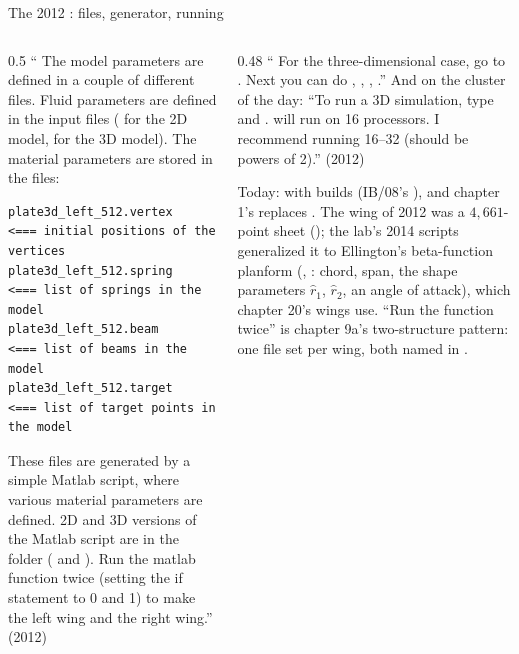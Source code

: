 \documentclass[aspectratio=169,11pt]{beamer}
\begin{document}
\begin{frame}[fragile]{The 2012 : files, generator, running}
\label{fr:plates3d}
\vspace{-2mm}
\begin{columns}[T,onlytextwidth]
\begin{column}{0.5\textwidth}
\footnotesize `` The model parameters are defined in a couple of different files. Fluid parameters are defined in the input files ( for the 2D model,  for the 3D model). The material parameters are stored in the files:
\begin{lstlisting}[style=data]
plate3d_left_512.vertex     <=== initial positions of the vertices
plate3d_left_512.spring     <=== list of springs in the model
plate3d_left_512.beam       <=== list of beams in the model
plate3d_left_512.target     <=== list of target points in the model
\end{lstlisting}
These files are generated by a simple Matlab script, where various material parameters are defined. 2D and 3D versions of the Matlab script are in the  folder ( and ). Run the matlab function twice (setting the if statement to 0 and 1) to make the left wing and the right wing.'' (2012)
\end{column}
\begin{column}{0.48\textwidth}
\footnotesize `` For the three-dimensional case, go to . Next you can do , , , .'' And on the cluster of the day: ``To run a 3D simulation, type  and .  will run on 16 processors. I recommend running 16--32 (should be powers of 2).'' (2012)
\vspace{1mm}

\scriptsize Today:  with  builds  (IB/08's ), and chapter 1's  replaces . The wing of 2012 was a $4{,}661$-point sheet (); the lab's 2014 scripts generalized it to Ellington's beta-function planform (, : chord, span, the shape parameters $\hat r_1$, $\hat r_2$, an angle of attack), which chapter 20's wings use. ``Run the function twice'' is chapter 9a's two-structure pattern: one file set per wing, both named in .
\end{column}
\end{columns}
\end{frame}
\end{document}
